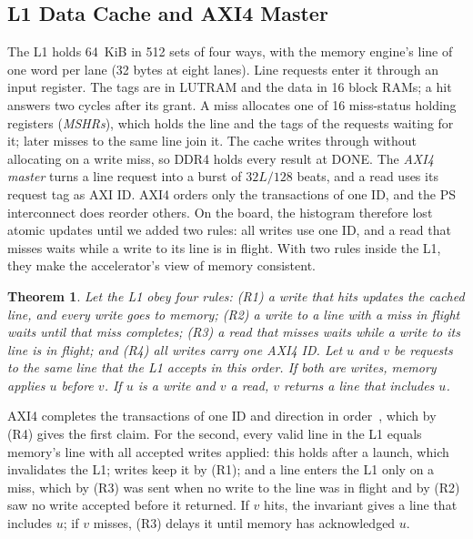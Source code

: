 \documentclass[journal]{IEEEtran}
\newtheorem{theorem}{Theorem}
\begin{document}
\subsection{L1 Data Cache and AXI4 Master}\label{sec:l1}
The L1 holds 64~KiB in 512 sets of four ways, with the memory engine's line of one
word per lane (32 bytes at eight lanes). Line requests enter it through an input
register. The tags are in LUTRAM and the data in 16 block RAMs; a hit answers two
cycles after its grant. A miss allocates one of 16 miss-status holding registers
(\emph{MSHRs}), which holds the line and the tags of the requests waiting for it; later
misses to the same line join it. The cache writes
through without allocating on a write miss, so DDR4 holds every result at DONE. The
\emph{AXI4 master} turns a line request into a burst of $32L/128$ beats, and a read uses
its request tag as AXI ID. AXI4 orders only the transactions of one ID, and the PS
interconnect does reorder others. On the board, the histogram therefore lost atomic
updates until we added two rules: all writes use one ID, and a read that misses waits
while a write to its line is in flight. With two rules inside the L1, they make the
accelerator's view of memory consistent.

\begin{theorem}\label{thm:order}
Let the L1 obey four rules: (R1) a write that hits updates the cached line, and every
write goes to memory; (R2) a write to a line with a miss in flight waits until that
miss completes; (R3) a read that misses waits while a write to its line is in flight;
and (R4) all writes carry one AXI4 ID. Let $u$ and $v$ be requests to the same line
that the L1 accepts in this order. If both are writes, memory applies $u$ before $v$.
If $u$ is a write and $v$ a read, $v$ returns a line that includes $u$.
\end{theorem}
\begin{IEEEproof}
AXI4 completes the transactions of one ID and direction in order~\cite{axi}, which by
(R4) gives the first claim. For the second, every valid line in the L1 equals memory's
line with all accepted writes applied: this holds after a launch, which invalidates the
L1; writes keep it by (R1); and a line enters the L1 only on a miss, which by (R3) was
sent when no write to the line was in flight and by (R2) saw no write accepted before
it returned. If $v$ hits, the invariant gives a line that includes $u$; if $v$ misses,
(R3) delays it until memory has acknowledged $u$.
\end{IEEEproof}
\end{document}
